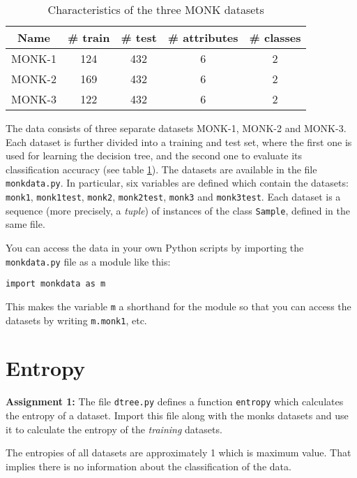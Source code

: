 \documentclass[11pt]{article}
\begin{document}
\begin{table}
  \caption{Characteristics of the three MONK datasets \label{tab:monk}}
  \begin{center}
    \begin{tabular}{|c|c|c|c|c|}\hline
      Name & \# train & \# test & \# attributes & \# classes\\ \hline \hline
      MONK-1 & 124 & 432 & 6 & 2\\ \hline
      MONK-2 & 169 & 432 & 6 & 2\\ \hline
      MONK-3 & 122 & 432 & 6 & 2\\ \hline
    \end{tabular}
  \end{center}
\end{table}

The data consists of three separate datasets MONK-1, MONK-2 and
MONK-3.  Each dataset is further divided into a training and test set,
where the first one is used for learning the decision tree, and the
second one to evaluate its classification accuracy (see table
\ref{tab:monk}).  The datasets are available in
the file \verb!monkdata.py!.  In particular, six variables are defined
which contain the datasets:
\verb!monk1!, \verb!monk1test!, \verb!monk2!,
\verb!monk2test!, \verb!monk3! and \verb!monk3test!.
Each dataset is a sequence (more precisely, a \emph{tuple}) of instances
of the class \texttt{Sample}, defined in the same file.

You can access the data in your own Python scripts by importing
the \texttt{monkdata.py} file as a module like this:
\begin{verbatim}
import monkdata as m
\end{verbatim}

This makes the variable \texttt{m} a shorthand for the module so that
you can access the datasets by writing \verb!m.monk1!, etc.


\section{Entropy}

\begin{tcolorbox}
\textbf{Assignment 1:} The file \verb!dtree.py! defines a function
\texttt{entropy} which calculates the entropy of a dataset.  Import
this file along with the monks datasets and use it to calculate the
entropy of the \emph{training} datasets.
\end{tcolorbox}

The entropies of all datasets are approximately 1 which is maximum value. That implies there is no information about the classification of the data.
\end{document}
